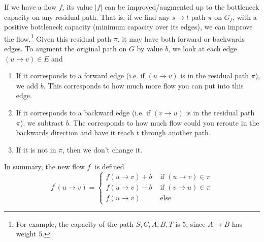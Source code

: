   \begin{theorem}
    If we have a flow $f$, its value $|f|$ can be improved/augmented up to the bottleneck capacity on any residual path. That is, if we find any $s \rightarrow t$ path $\pi$ on $G_f$, with a positive bottleneck capacity (minimum capacity over its edges), we can improve the flow.\footnote{For example, the capacity of the path $S, C, A, B, T$ is $5$, since $A \rightarrow B$ has weight $5$.} Given this residual path $\pi$, it may have both forward or backwards edges. To augment the original path on $G$ by value $b$, we look at each edge $(u \rightarrow v) \in E$ and 
    \begin{enumerate}
      \item If it corresponds to a forward edge (i.e. if $(u \rightarrow v)$ is in the residual path $\pi$), we add $b$. This corresponds to how much more flow you can put into this edge. 
      \item If it corresponds to a backward edge (i.e. if $(v \rightarrow u)$ is in the residual path $\pi$), we subtract $b$. The corresponds to how much flow could you reroute in the backwards direction and have it reach $t$ through another path.   
      \item If it is not in $\pi$, then we don't change it. 
    \end{enumerate}
    In summary, the new flow $f^\prime$ is defined 
    \begin{equation}
      f^\prime (u \rightarrow v) = \begin{cases} 
        f(u \rightarrow v) + b & \text{ if } (u \rightarrow v) \in \pi \\ 
        f(u \rightarrow v) - b & \text{ if } (v \rightarrow u) \in \pi \\  
        f(u \rightarrow v) & \text{ else }
      \end{cases}
    \end{equation}
  \end{theorem} 
